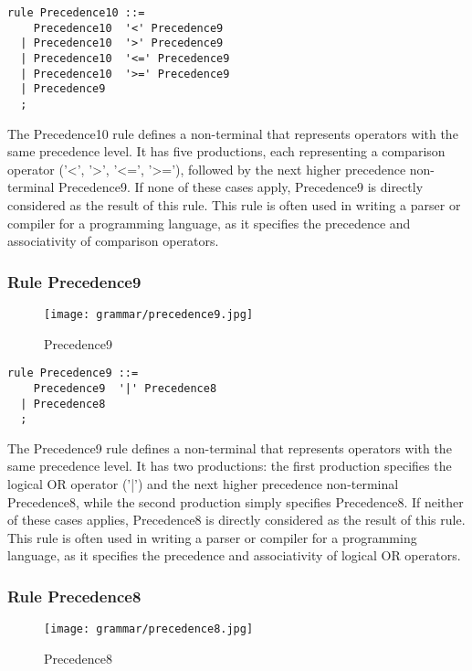 \begin{lstlisting}
rule Precedence10 ::=
    Precedence10  '<' Precedence9 
  | Precedence10  '>' Precedence9 
  | Precedence10  '<=' Precedence9 
  | Precedence10  '>=' Precedence9 
  | Precedence9 
  ;
\end{lstlisting}

The Precedence10 rule defines a non-terminal that represents operators with the same precedence level. It has five productions, each representing a comparison operator ('<', '>', '<=', '>='), followed by the next higher precedence non-terminal Precedence9. If none of these cases apply, Precedence9 is directly considered as the result of this rule. This rule is often used in writing a parser or compiler for a programming language, as it specifies the precedence and associativity of comparison operators.

\subsubsection*{Rule Precedence9}

\begin{figure}[!ht]
\centering
\texttt{[image: grammar/precedence9.jpg]}
\caption{Precedence9}
\end{figure}

\begin{lstlisting}
rule Precedence9 ::=
    Precedence9  '|' Precedence8 
  | Precedence8 
  ;
\end{lstlisting}

The Precedence9 rule defines a non-terminal that represents operators with the same precedence level. It has two productions: the first production specifies the logical OR operator ('|') and the next higher precedence non-terminal Precedence8, while the second production simply specifies Precedence8. If neither of these cases applies, Precedence8 is directly considered as the result of this rule. This rule is often used in writing a parser or compiler for a programming language, as it specifies the precedence and associativity of logical OR operators.

\subsubsection*{Rule Precedence8}

\begin{figure}[!ht]
\centering
\texttt{[image: grammar/precedence8.jpg]}
\caption{Precedence8}
\end{figure}

